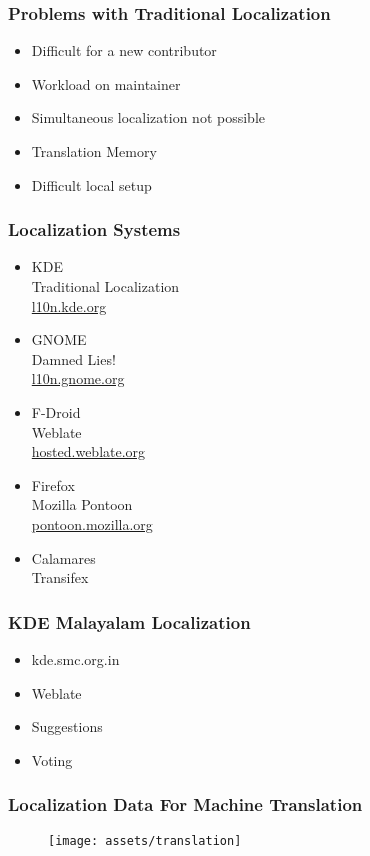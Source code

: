\documentclass{beamer}
\begin{document}
\begin{frame}
\frametitle{Problems with Traditional Localization}
\begin{itemize}
	\item Difficult for a new contributor
	\item Workload on maintainer
	\item Simultaneous localization not possible
	\item Translation Memory
	\item Difficult local setup
\end{itemize}
\end{frame}

\begin{frame}
\frametitle{Localization Systems}
\begin{itemize}
	\item KDE \\ Traditional Localization \\ \href{https://l10n.kde.org}{l10n.kde.org}
	\item GNOME \\ Damned Lies! \\ \href{https://l10n.gnome.org}{l10n.gnome.org}
	\item F-Droid \\ Weblate \\ \href{https://hosted.weblate.org}{hosted.weblate.org}
	\item Firefox \\ Mozilla Pontoon \\ \href{https://pontoon.mozilla.org/}{pontoon.mozilla.org}
	\item Calamares \\ Transifex
\end{itemize}
\end{frame}

\begin{frame}
\frametitle{KDE Malayalam Localization}
\begin{itemize}
	\item kde.smc.org.in
	\item Weblate
	\item Suggestions
	\item Voting
\end{itemize}
\end{frame}

\begin{frame}
\frametitle{Localization Data For Machine Translation}
\begin{figure}
	\texttt{[image: assets/translation]}
\end{figure}
\end{frame}
\end{document}
